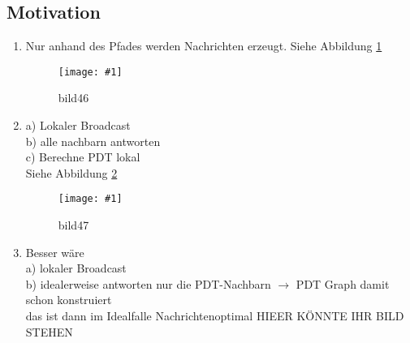 \documentclass{article}
\newcommand{\bild}[4]{ %
	\begin{figure}[h!]
		\centering
		\texttt{[image: \#1]}
		\caption{#3}
		\label{#4}
	\end{figure}	
}
\newcommand{\sieheBild}[4]{
	Siehe Abbildung \ref{#4}
	\bild{#1}{#2}{#3}{#4}
}
\begin{document}
\subsection*{Motivation}
\begin{enumerate}
	\item Nur anhand des Pfades werden Nachrichten erzeugt. \sieheBild{Bilder/46.png}{0.4}{bild46}{Bild 46}
	\item a) Lokaler Broadcast \\
			b) alle nachbarn antworten\\
			c) Berechne PDT lokal\\
			\sieheBild{Bilder/47.png}{0.4}{bild47}{Bild 47}
	\item Besser wäre \\
			a) lokaler Broadcast\\
			b) idealerweise antworten nur die PDT-Nachbarn $\rightarrow$ PDT Graph damit schon konstruiert\\
			das ist dann im Idealfalle Nachrichtenoptimal
			HIEER KÖNNTE IHR BILD STEHEN
\end{enumerate}
\end{document}
